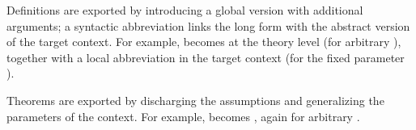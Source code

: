 \begin{isabellebody}
\begin{isamarkuptext}
  Definitions are exported by introducing a global version with
  additional arguments; a syntactic abbreviation links the long form
  with the abstract version of the target context.  For example,
   becomes  at the theory
  level (for arbitrary ), together with a local
  abbreviation  in the target context (for the
  fixed parameter ).

  Theorems are exported by discharging the assumptions and
  generalizing the parameters of the context.  For example,  becomes , again for arbitrary
  .


\end{isamarkuptext}
\end{isabellebody}
